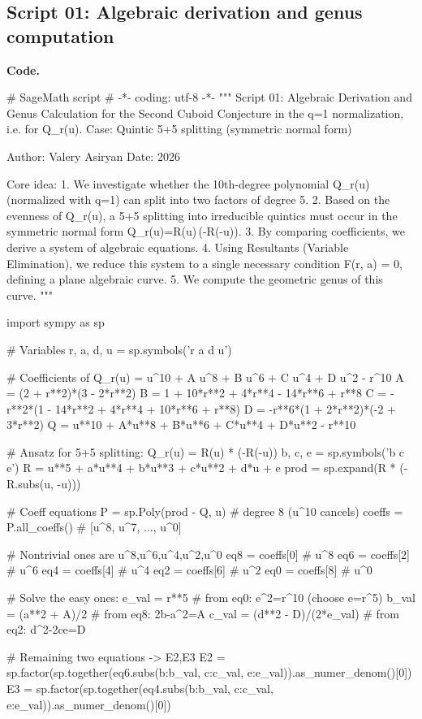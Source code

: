 \documentclass[12pt]{article}
\theoremstyle{remark}
\theoremstyle{definition}
\begin{document}
\subsection*{Script 01: Algebraic derivation and genus computation}
\noindent\textbf{Code.}
\begin{code}
# SageMath script
# -*- coding: utf-8 -*-
"""
Script 01: Algebraic Derivation and Genus Calculation for the Second Cuboid Conjecture in the q=1 normalization, i.e. for Q_r(u).
Case: Quintic 5+5 splitting (symmetric normal form)

Author: Valery Asiryan
Date: 2026

Core idea:
1.  We investigate whether the 10th-degree polynomial Q_r(u) (normalized with q=1)
    can split into two factors of degree 5.
2.  Based on the evenness of Q_r(u), a 5+5 splitting into irreducible quintics must occur in the symmetric normal form
    Q_r(u)=R(u)\,(-R(-u)).
3.  By comparing coefficients, we derive a system of algebraic equations.
4.  Using Resultants (Variable Elimination), we reduce this system to a single
    necessary condition F(r, a) = 0, defining a plane algebraic curve.
5.  We compute the geometric genus of this curve.
"""

import sympy as sp

# Variables
r, a, d, u = sp.symbols('r a d u')

# Coefficients of Q_r(u) = u^10 + A u^8 + B u^6 + C u^4 + D u^2 - r^10
A = (2 + r**2)*(3 - 2*r**2)
B = 1 + 10*r**2 + 4*r**4 - 14*r**6 + r**8
C = -r**2*(1 - 14*r**2 + 4*r**4 + 10*r**6 + r**8)
D = -r**6*(1 + 2*r**2)*(-2 + 3*r**2)
Q = u**10 + A*u**8 + B*u**6 + C*u**4 + D*u**2 - r**10

# Ansatz for 5+5 splitting: Q_r(u) = R(u) * (-R(-u))
b, c, e = sp.symbols('b c e')
R = u**5 + a*u**4 + b*u**3 + c*u**2 + d*u + e
prod = sp.expand(R * (-R.subs(u, -u)))

# Coeff equations
P = sp.Poly(prod - Q, u)    # degree 8 (u^10 cancels)
coeffs = P.all_coeffs()     # [u^8, u^7, ..., u^0]

# Nontrivial ones are u^8,u^6,u^4,u^2,u^0
eq8 = coeffs[0]   # u^8
eq6 = coeffs[2]   # u^6
eq4 = coeffs[4]   # u^4
eq2 = coeffs[6]   # u^2
eq0 = coeffs[8]   # u^0

# Solve the easy ones:
e_val = r**5                      # from eq0: e^2=r^10 (choose e=r^5)
b_val = (a**2 + A)/2              # from eq8: 2b-a^2=A
c_val = (d**2 - D)/(2*e_val)      # from eq2: d^2-2ce=D

# Remaining two equations -> E2,E3
E2 = sp.factor(sp.together(eq6.subs({b:b_val, c:c_val, e:e_val})).as_numer_denom()[0])
E3 = sp.factor(sp.together(eq4.subs({b:b_val, c:c_val, e:e_val})).as_numer_denom()[0])


\end{code}
\end{document}
